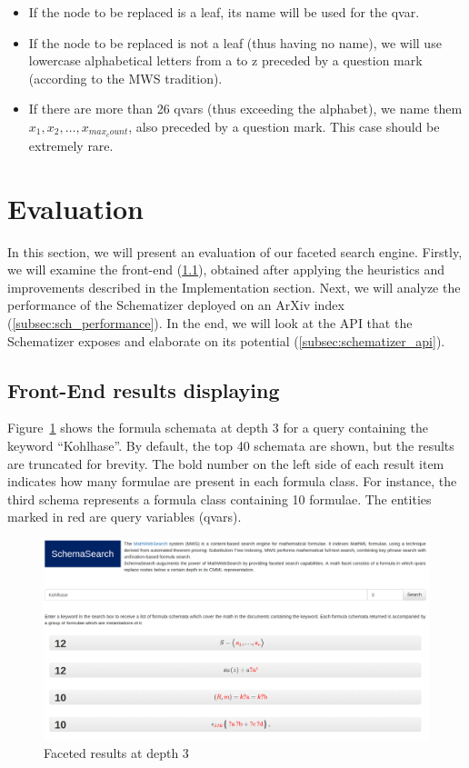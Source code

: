 \documentclass[a4paper,11pt,oneside]{article}
\def\MWS{\textsf{MWS}\xspace}
\def\arxiv{\textsf{ArXiv}\xspace}
\begin{document}
\begin{itemize}
    \item If the node to be replaced is a leaf, its name will be used for the
        qvar.
    \item If the node to be replaced is not a leaf (thus having no name), we
        will use lowercase alphabetical letters from \textsf{a} to \textsf{z}
        preceded by a question mark (according to the \MWS tradition).
    \item If there are more than 26 qvars (thus exceeding the alphabet), we
        name them $x_{1}, x_{2}, \ldots, x_{max_count}$, also preceded by a
        question mark. This case should be extremely rare.
\end{itemize}

\section{Evaluation}\label{sec:evaluation}
In this section, we will present an evaluation of our faceted search engine.
Firstly, we will examine the front-end (\ref{subsec:fe_results_display}),
obtained after applying the heuristics and improvements described in the
Implementation section. Next, we will analyze the performance of the
Schematizer deployed on an \arxiv index (\ref{subsec:sch_performance}).
In the end, we will look at the API that the Schematizer exposes and elaborate
on its potential (\ref{subsec:schematizer_api}).

\subsection{Front-End results displaying}\label{subsec:fe_results_display}
Figure~\ref{fig:schemata_group} shows the formula schemata at depth 3 for a
query containing the keyword ``Kohlhase''. By default, the top 40 schemata are
shown, but the results are truncated for brevity.
The bold number on the left side of each result item indicates how many
formulae are present in each formula class. For instance, the third schema
represents a formula class containing 10 formulae. The entities marked in red
are query variables (qvars).

\begin{figure}[ht]\centering
    \includegraphics[width=12.8cm]{img/schemataGroup.png}
    \caption{Faceted results at depth 3}\label{fig:schemata_group}
\end{figure}
\end{document}
